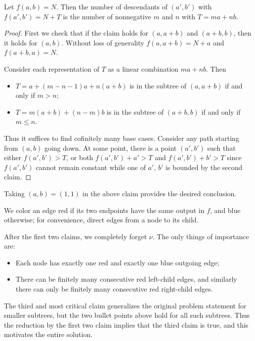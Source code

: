 \begin{claim}
     Let $f(a,b)=N$. Then the number of descendants of $(a',b')$ with $f(a',b')=N+T$ is the number of nonnegative $m$ and $n$ with $T=ma+nb$.
\end{claim}
\begin{proof}
    First we check that if the claim holds for $(a,a+b)$ and $(a+b,b)$, then it holds for $(a,b)$. Without loss of generality $f(a,a+b)=N+a$ and  $f(a+b,a)=N$.

    Consider each representation of $T$ as a linear combination $ma+nb$. Then
    \begin{itemize}[itemsep=0em]
        \item $T=a+(m-n-1)a+n(a+b)$ is in the subtree of $(a,a+b)$ if and only if $m>n$;
        \item $T=m(a+b)+(n-m)b$ is in the subtree of $(a+b,b)$ if and only if $m\le n$.
    \end{itemize}
    Thus it suffices to find cofinitely many base cases. Consider any path starting from $(a,b)$ going down. At some point, there is a point $(a',b')$ such that either $f(a',b')>T$, or both $f(a',b')+a'>T$ and $f(a',b')+b'>T$ since $f(a',b')$ cannot remain constant while one of $a'$, $b'$ is bounded by the second claim.
\end{proof}

Taking $(a,b)=(1,1)$ in the above claim provides the desired conclusion.
\begin{remark}
    We color an edge red if its two endpoints have the same output in $f$, and blue otherwise; for convenience, direct edges from a node to its child.

    After the first two claims, we completely forget $\nu$. The only things of importance are:
    \begin{itemize}
        \item Each node has exactly one red and exactly one blue outgoing edge;
        \item There can be finitely many consecutive red left-child edges, and similarly there can only be finitely many consecutive red right-child edges.
    \end{itemize}
    The third and most critical claim generalizes the original problem statement for smaller subtrees, but the two bullet points above hold for all such subtrees. Thus the reduction by the first two claim implies that the third claim is true, and this motivates the entire solution.
\end{remark}
